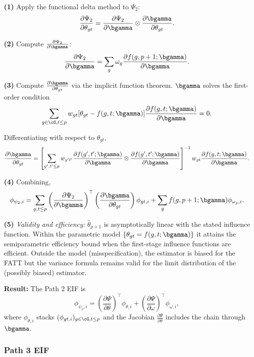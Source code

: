 \documentclass{article}
\begin{document}
\textbf{(1)} Apply the functional delta method to $\Psi_2$:
\[
\frac{\partial \Psi_2}{\partial \theta_{gt}} = \frac{\partial \Psi_2}{\partial \bgamma} \otimes \frac{\partial \bgamma}{\partial \theta_{gt}}.
\]

\textbf{(2)} Compute $\frac{\partial \Psi_2}{\partial \bgamma}$:
\[
\frac{\partial \Psi_2}{\partial \bgamma} = \sum_{g} \omega_g \frac{\partial f(g,p+1;\bgamma)}{\partial \bgamma}.
\]

\textbf{(3)} Compute $\frac{\partial \bgamma}{\partial \theta_{gt}}$ via the implicit function theorem. $\bgamma$ solves the first-order condition
\[
\sum_{g \in \cG, t \leq p} w_{gt} [\theta_{gt} - f(g,t;\bgamma)] \frac{\partial f(g,t;\bgamma)}{\partial \bgamma} = 0.
\]

Differentiating with respect to $\theta_{gt}$,
\[
\frac{\partial \bgamma}{\partial \theta_{gt}} = \left[\sum_{g',t' \leq p} w_{g't'} \frac{\partial f(g',t';\bgamma)}{\partial \bgamma} \otimes \frac{\partial f(g',t';\bgamma)}{\partial \bgamma}\right]^{-1} w_{gt} \frac{\partial f(g,t;\bgamma)}{\partial \bgamma}.
\]

\textbf{(4)} Combining,
\[
\phi_{\psi_2,i} = \sum_{g,t \leq p} \left(\frac{\partial \Psi_2}{\partial \bgamma}\right)^\top \left(\frac{\partial \bgamma}{\partial \theta_{gt}}\right) \phi_{gt,i} + \sum_g f(g,p+1;\bgamma) \phi_{\omega_g,i}.
\]

\textbf{(5)} \textit{Validity and efficiency:} $\widehat{\theta}_{p+1}$ is asymptotically linear with the stated influence function. Within the parametric model $\{\theta_{gt} = f(g,t;\bgamma)\}$ it attains the semiparametric efficiency bound when the first-stage influence functions are efficient. Outside the model (misspecification), the estimator is biased for the FATT but the variance formula remains valid for the limit distribution of the (possibly biased) estimator.

\textbf{Result:} The Path 2 EIF is
\[
\phi_{\psi_2,i} = \left(\frac{\partial \Psi}{\partial \theta}\right)^\top \phi_{\theta,i} + \left(\frac{\partial \Psi}{\partial \omega}\right)^\top \phi_{\omega,i},
\]
where $\phi_{\theta,i}$ stacks $(\phi_{gt,i})_{g \in \cG, t \leq p}$ and the Jacobian $\frac{\partial \Psi}{\partial \theta}$ includes the chain through $\bgamma$.

\subsubsection{Path 3 EIF}\label{app:eif3}
\end{document}
